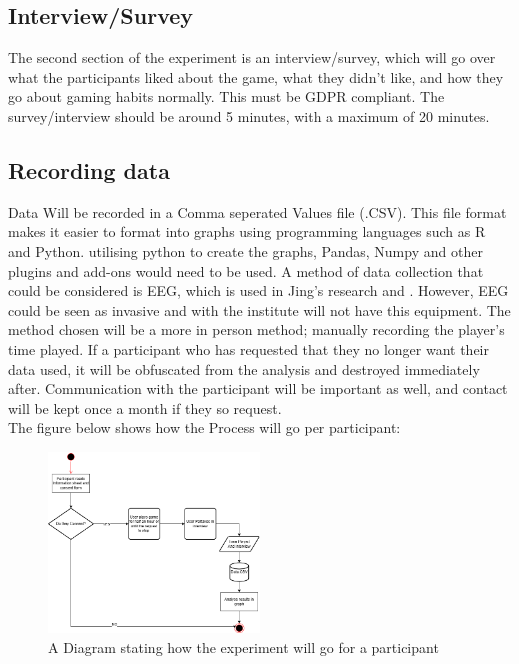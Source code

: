 \documentclass[conference]{IEEEtran}
\begin{document}
\subsection{Interview/Survey}
The second section of the experiment is an interview/survey, which will go over what the participants liked about the game, what they didn't like, and how they go about gaming habits normally. This must be GDPR compliant. The survey/interview should be around 5 minutes, with a maximum of 20 minutes.

\subsection{Recording data}
Data Will be recorded in a Comma seperated Values file (.CSV). This file format makes it easier to format into graphs using programming languages such as R and Python. utilising python to create the graphs, Pandas, Numpy and other plugins and add-ons would need to be used. A method of data collection that could be considered is EEG, which is used in Jing's research \cite{Jing2024} and \cite{Ruqeyya2022}. However, EEG could be seen as invasive and with the institute will not have this equipment. The method chosen will be a more in person method; manually recording the player's time played. If a participant who has requested that they no longer want their data used, it will be obfuscated from the analysis and destroyed immediately after. Communication with the participant will be important as well, and contact will be kept once a month if they so request.\\

The figure below shows how the Process will go per participant:

\begin{figure}[H]
\includegraphics[width = 0.5\textwidth]{UMLProcess}
\caption{A Diagram stating how the experiment will go for a participant}
\end{figure}
\end{document}
